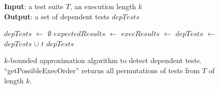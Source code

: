 \begin{figure}[t]
\textbf{Input}: a test suite $\mathit{T}$, an execution length $\mathit{k}$\\
\textbf{Output}: a set of dependent tests $\mathit{depTests}$\\
\vspace{-5mm}
\begin{algorithmic}[1]
\STATE $\mathit{depTests}$ $\leftarrow$ $\emptyset$
\STATE $\mathit{expectedResults}$ $\leftarrow$
\STATE $\mathit{execResults}$ $\leftarrow$
\executeTestsInOrder{\testlist}
\STATE $\mathit{depTests}$ $\leftarrow$ $\mathit{depTests}$ $\cup$ $\mathit{t}$
\ENDIF
\ENDFOR
\ENDFOR
\RETURN $\mathit{depTests}$
\end{algorithmic}
\vspace{-3mm}
\caption{$k$-bounded approximation algorithm to detect dependent
tests. 
``getPossibleExecOrder'' returns all permutations of tests from $T$ of length $k$. 
} 
\label{fig:dtalgorithm}
\end{figure}
